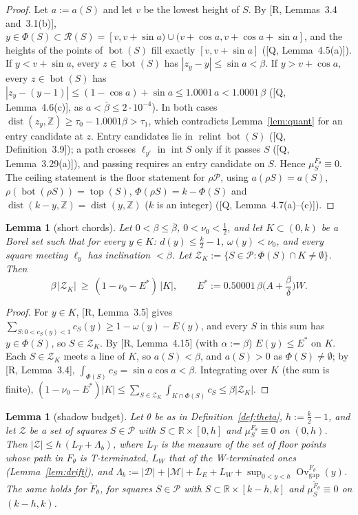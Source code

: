 \documentclass[11pt]{amsart}
\newcommand{\R}{\mathbb R}
\newcommand{\Z}{\mathbb Z}
\newcommand{\cP}{\mathcal P}
\newcommand{\cD}{\mathcal D}
\newcommand{\cM}{\mathcal M}
\newcommand{\cR}{\mathcal R}
\newcommand{\cZ}{\mathcal Z}
\newcommand{\relint}{\operatorname{relint}}
\newcommand{\Bot}{\operatorname{bot}}
\newcommand{\Top}{\operatorname{top}}
\newcommand{\dist}{\operatorname{dist}}
\newcommand{\Ovgap}{\operatorname{Ov}_{\mathrm{gap}}}
\newcommand{\bbar}{\bar\beta}
\newcommand{\Lam}{\Lambda}
\newtheorem{lemma}[theorem]{Lemma}
\theoremstyle{definition}
\theoremstyle{remark}
\numberwithin{equation}{section}
\begin{document}
\begin{proof}
Let $a:=a(S)$ and let $v$ be the lowest height of $S$. By [R, Lemmas~3.4 and~3.1(b)],
$y\in\Phi(S)\subset\cR(S)=[v,v+\sin a)\cup(v+\cos a,v+\cos a+\sin a]$, and the heights of the points of $\Bot(S)$ fill
exactly $[v,v+\sin a]$ ([Q, Lemma~4.5(a)]). If $y<v+\sin a$, every $z\in\Bot(S)$ has $|z_y-y|\le\sin a<\beta$. If
$y>v+\cos a$, every $z\in\Bot(S)$ has $|z_y-(y-1)|\le(1-\cos a)+\sin a\le1.0001\,a<1.0001\,\beta$ ([Q, Lemma~4.6(c)],
as $a<\bbar\le2\cdot10^{-4}$). In both cases $\dist(z_y,\Z)\ge\tau_0-1.0001\beta>\tau_1$, which contradicts
Lemma~\ref{lem:quant} for an entry candidate at $z$. Entry candidates lie in $\relint\Bot(S)$ ([Q, Definition~3.9]); a path
crosses $\ell_{y'}$ in $\operatorname{int}S$ only if it passes $S$ ([Q, Lemma~3.29(a)]), and passing requires an entry
candidate on $S$. Hence $\mu_S^{F_\theta}\equiv0$. The ceiling statement is the floor statement for $\rho\cP$, using
$a(\rho S)=a(S)$, $\rho(\Bot(\rho S))=\Top(S)$, $\Phi(\rho S)=k-\Phi(S)$ and $\dist(k-y,\Z)=\dist(y,\Z)$ ($k$ is an
integer) ([Q, Lemma~4.7(a)--(c)]).
\end{proof}

\begin{lemma}[short chords]\label{lem:short}
Let $0<\beta\le\bbar$, $0<\nu_0<\frac12$, and let $K\subset(0,k)$ be a Borel set such that for every $y\in K$:
$d(y)\le\frac k2-1$, $\omega(y)<\nu_0$, and every square meeting $\ell_y$ has inclination $<\beta$. Let
$\cZ_K:=\{S\in\cP:\Phi(S)\cap K\ne\emptyset\}$. Then
\[
\beta\,|\cZ_K|\ \ge\ (1-\nu_0-E^*)\,|K|,\qquad E^*:=0.50001\,\beta\Big(A+\frac\beta\delta\Big)W .
\]
\end{lemma}

\begin{proof}
For $y\in K$, [R, Lemma~3.5] gives $\sum_{S:0<c_S(y)<1}c_S(y)\ge1-\omega(y)-E(y)$, and every $S$ in this sum has
$y\in\Phi(S)$, so $S\in\cZ_K$. By [R, Lemma~4.15] (with $\alpha:=\beta$) $E(y)\le E^*$ on $K$. Each $S\in\cZ_K$ meets a
line of $K$, so $a(S)<\beta$, and $a(S)>0$ as $\Phi(S)\ne\emptyset$; by [R, Lemma~3.4],
$\int_{\Phi(S)}c_S=\sin a\cos a<\beta$. Integrating over $K$ (the sum is finite),
$(1-\nu_0-E^*)|K|\le\sum_{S\in\cZ_K}\int_{K\cap\Phi(S)}c_S\le\beta|\cZ_K|$.
\end{proof}

\begin{lemma}[shadow budget]\label{lem:budget}
Let $\theta$ be as in Definition~\ref{def:theta}, $h:=\frac k2-1$, and let $\cZ$ be a set of squares $S\in\cP$ with
$S\subset\R\times[0,h]$ and $\mu_S^{F_\theta}\equiv0$ on $(0,h)$. Then $|\cZ|\le h\,(L_T+\Lam_b)$, where $L_T$ is the
measure of the set of floor points whose path in $F_\theta$ is T-terminated, $L_W$ that of the W-terminated ones
(Lemma~\ref{lem:drift}), and $\Lam_b:=|\cD|+|\cM|+L_E+L_W+\sup_{0<y<h}\Ovgap^{F_\theta}(y)$. The same holds for
$\tilde F_\theta$, for squares $S\in\cP$ with $S\subset\R\times[k-h,k]$ and $\mu_S^{\tilde F_\theta}\equiv0$ on $(k-h,k)$.
\end{lemma}
\end{document}
